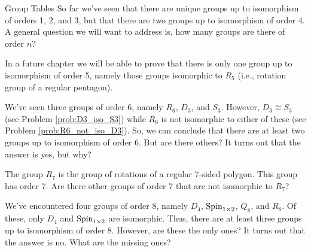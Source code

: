 \begin{section}{Group Tables}
So far we've seen that there are unique groups up to isomorphism of orders 1, 2, and 3, but that there are two groups up to isomorphism of order 4.  A general question we will want to address is, how many groups are there of order \(n\)?

In a future chapter we will be able to prove that there is only one group up to isomorphism of order 5, namely those groups isomorphic to \(R_5\) (i.e., rotation group of a regular pentagon).

We've seen three groups of order 6, namely \(R_6\), \(D_3\), and \(S_3\).  However, \(D_3\cong S_3\) (see Problem \ref{prob:D3_iso_S3}) while \(R_6\) is not isomorphic to either of these (see Problem \ref{prob:R6_not_iso_D3}).  So, we can conclude that there are at least two groups up to isomorphism of order 6.   But are there others?  It turns out that the answer is yes, but why?

The group \(R_7\) is the group of rotations of a regular 7-sided polygon.  This group has order 7.  Are there other groups of order 7 that are not isomorphic to \(R_7\)? 

We've encountered four groups of order 8, namely \(D_4\), \(\operatorname{Spin}_{1\times 2}\), \(Q_8\), and \(R_8\).  Of these, only \(D_4\) and \(\operatorname{Spin}_{1\times 2}\) are isomorphic.  Thus, there are at least three groups up to isomorphism of order 8.  However, are these the only ones?  It turns out that the answer is no.  What are the missing ones?

\end{section}

